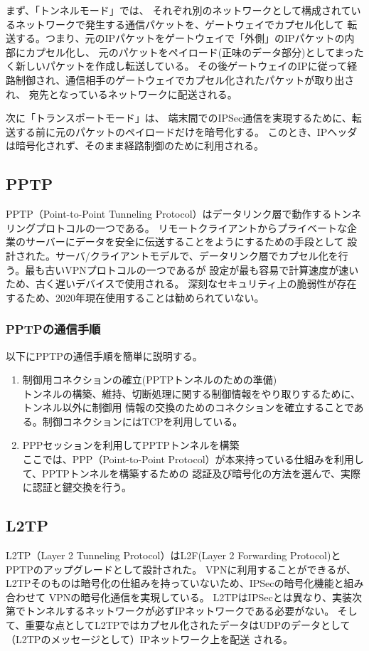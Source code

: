 \documentclass[11pt,a4j,titlepage]{jreport}
\begin{document}
まず、「トンネルモード」では、
    それぞれ別のネットワークとして構成されているネットワークで発生する通信パケットを、ゲートウェイでカプセル化して
    転送する。つまり、元のIPパケットをゲートウェイで「外側」のIPパケットの内部にカプセル化し、
    元のパケットをペイロード(正味のデータ部分)としてまったく新しいパケットを作成し転送している。
    その後ゲートウェイのIPに従って経路制御され、通信相手のゲートウェイでカプセル化されたパケットが取り出され、
    宛先となっているネットワークに配送される。

次に「トランスポートモード」は、
端末間でのIPSec通信を実現するために、転送する前に元のパケットのペイロードだけを暗号化する。
このとき、IPヘッダは暗号化されず、そのまま経路制御のために利用される。


\subsection{PPTP}
PPTP（Point-to-Point Tunneling Protocol）\cite{RFC2637}はデータリンク層で動作するトンネリングプロトコルの一つである。
リモートクライアントからプライベートな企業のサーバーにデータを安全に伝送することをようにするための手段として
設計された。サーバ/クライアントモデルで、データリンク層でカプセル化を行う。最も古いVPNプロトコルの一つであるが
設定が最も容易で計算速度が速いため、古く遅いデバイスで使用される。
深刻なセキュリティ上の脆弱性が存在するため、2020年現在使用することは勧められていない。
\subsubsection*{PPTPの通信手順}
以下にPPTPの通信手順を簡単に説明する。
\begin{enumerate}
    \setlength{\parskip}{0.05cm} %
    \setlength{\itemsep}{0.05cm}
    \item 制御用コネクションの確立(PPTPトンネルのための準備)\mbox{}\\
    トンネルの構築、維持、切断処理に関する制御情報をやり取りするために、トンネル以外に制御用
    情報の交換のためのコネクションを確立することである。制御コネクションにはTCPを利用している。
    \item PPPセッションを利用してPPTPトンネルを構築\mbox{}\\
    ここでは、PPP（Point-to-Point Protocol）\cite{RFC1661}が本来持っている仕組みを利用して、PPTPトンネルを構築するための
    認証及び暗号化の方法を選んで、実際に認証と鍵交換を行う。
\end{enumerate}

\subsection{L2TP}
L2TP（Layer 2 Tunneling Protocol）\cite{RFC2661}はL2F(Layer 2 Forwarding Protocol)\cite{RFC2341}とPPTPのアップグレードとして設計された。
VPNに利用することができるが、L2TPそのものは暗号化の仕組みを持っていないため、IPSecの暗号化機能と組み合わせて
VPNの暗号化通信を実現している。
L2TPはIPSecとは異なり、実装次第でトンネルするネットワークが必ずIPネットワークである必要がない。
そして、重要な点としてL2TPではカプセル化されたデータはUDPのデータとして（L2TPのメッセージとして）IPネットワーク上を配送
される。
\end{document}
